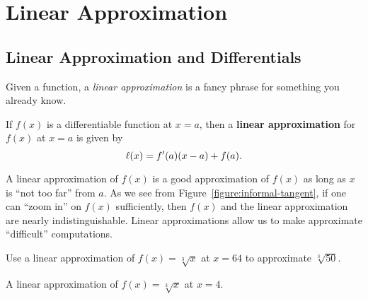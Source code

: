 \chapter{Linear Approximation}

\section{Linear Approximation and Differentials}



Given a function, a \textit{linear approximation} is a fancy phrase
for something you already know.

\begin{definition}
If $f(x)$ is a differentiable function at $x=a$, then a \textbf{linear
  approximation} for $f(x)$ at $x=a$ is given by
\[
\ell(x) = f'(a)(x-a) +f(a).
\]
\end{definition}

A linear approximation of $f(x)$ is a good approximation of $f(x)$ as
long as $x$ is ``not too far'' from $a$.  As we see from
Figure~\ref{figure:informal-tangent}, if one can ``zoom in'' on $f(x)$
sufficiently, then $f(x)$ and the linear approximation are nearly
indistinguishable. Linear approximations allow us to make approximate
``difficult'' computations.

\begin{example}
Use a linear approximation of $f(x) =\sqrt[3]{x}$ at $x=64$ to
approximate $\sqrt[3]{50}$.
\end{example}



\begin{marginfigure}
\caption{A linear approximation of $f(x) = \sqrt[3]{x}$ at $x=4$.}
\label{figure:la sqrt3x}
\end{marginfigure}


